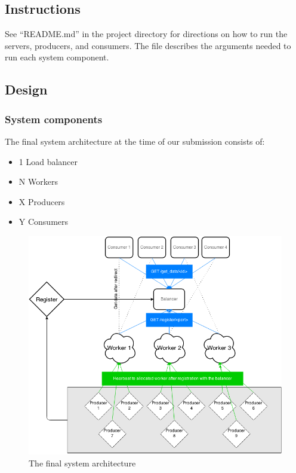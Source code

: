 \documentclass{sigchi}
\begin{document}
\subsection{Instructions}

See \enquote{README.md} in the project directory for directions on how to run the servers, producers, and consumers. The file describes the arguments needed to run each system component.

\subsection{Design}

\subsubsection{System components}

The final system architecture at the time of our submission consists of:

\begin{itemize}
  \item 1 Load balancer
  \item N Workers
  \item X Producers
  \item Y Consumers
\end{itemize}

\begin{figure}[!h]
\centering
\includegraphics[width=0.9\columnwidth]{img/main}
\caption{The final system architecture}
\label{fig:main}
\end{figure}
\end{document}
